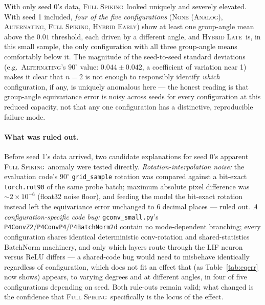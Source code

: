 \documentclass[11pt]{article}
\newcommand{\None}{\textsc{None (Analog)}}
\newcommand{\Alternating}{\textsc{Alternating}}
\newcommand{\FullSpiking}{\textsc{Full Spiking}}
\newcommand{\HybridLate}{\textsc{Hybrid Late}}
\newcommand{\HybridEarly}{\textsc{Hybrid Early}}
\begin{document}
\noindent With only seed 0's data, \FullSpiking\ looked uniquely and severely elevated. With seed 1
included, \emph{four of the five configurations} (\None, \Alternating, \FullSpiking, \HybridEarly) show
at least one group-angle mean above the $0.01$ threshold, each driven by a different angle, and
\HybridLate\ is, in this small sample, the only configuration with all three group-angle means
comfortably below it. The magnitude of the seed-to-seed standard deviations (e.g.\ \Alternating's
$90^\circ$ value: $0.044 \pm 0.042$, a coefficient of variation near 1) makes it clear that $n=2$ is
not enough to responsibly identify \emph{which} configuration, if any, is uniquely anomalous here ---
the honest reading is that group-angle equivariance error is noisy across seeds for every
configuration at this reduced capacity, not that any one configuration has a distinctive, reproducible
failure mode.

\paragraph{What was ruled out.} Before seed 1's data arrived, two candidate explanations for seed 0's
apparent \FullSpiking\ anomaly were tested directly. \emph{Rotation-interpolation noise:} the
evaluation code's $90^\circ$ \texttt{grid\_sample} rotation was compared against a bit-exact
\texttt{torch.rot90} of the same probe batch; maximum absolute pixel difference was $\sim 2\times10^{-6}$
(float32 noise floor), and feeding the model the bit-exact rotation instead left the equivariance
error unchanged to 6 decimal places --- ruled out. \emph{A configuration-specific code bug:}
\texttt{gconv\_small.py}'s \texttt{P4ConvZ2}/\texttt{P4ConvP4}/\texttt{P4BatchNorm2d} contain no
mode-dependent branching; every configuration shares identical deterministic conv-rotation and
shared-statistics BatchNorm machinery, and only which layers route through the LIF neuron versus ReLU
differs --- a shared-code bug would need to misbehave identically regardless of configuration, which
does not fit an effect that (as Table~\ref{tab:eqerr} now shows) appears, to varying degrees and at
different angles, in four of five configurations depending on seed. Both rule-outs remain valid; what
changed is the confidence that \FullSpiking\ specifically is the locus of the effect.
\end{document}

